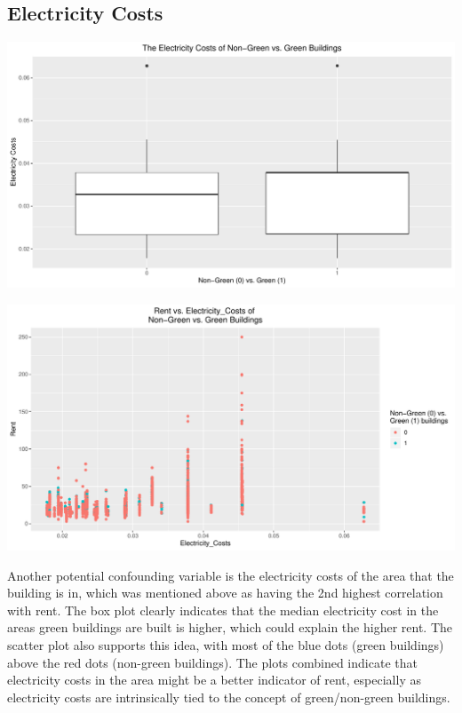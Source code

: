 \documentclass[]{article}
\begin{document}
\hypertarget{electricity-costs}{%
\subsection{Electricity Costs}\label{electricity-costs}}

\includegraphics{Report_files/figure-latex/elec_box-1.pdf}

\includegraphics{Report_files/figure-latex/elec_scatter-1.pdf}

Another potential confounding variable is the electricity costs of the
area that the building is in, which was mentioned above as having the
2nd highest correlation with rent. The box plot clearly indicates that
the median electricity cost in the areas green buildings are built is
higher, which could explain the higher rent. The scatter plot also
supports this idea, with most of the blue dots (green buildings) above
the red dots (non-green buildings). The plots combined indicate that
electricity costs in the area might be a better indicator of rent,
especially as electricity costs are intrinsically tied to the concept of
green/non-green buildings.
\end{document}
